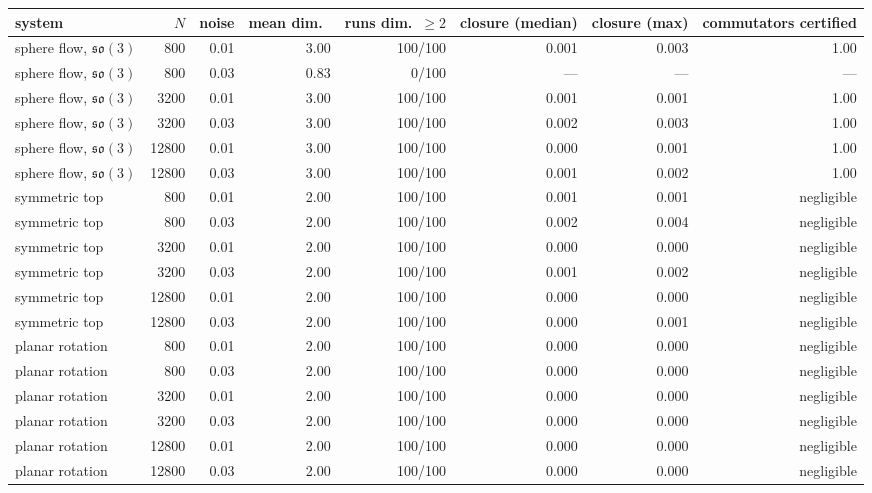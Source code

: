 \begin{table}[!htbp]
\centering\small
\begin{adjustbox}{max width=\textwidth, max totalheight=0.9\textheight}
\begin{tabular}{lrrrrrrr}
\toprule
system & $N$ & noise & mean dim.\ & runs dim.\ $\ge 2$ & closure (median) & closure (max) & commutators certified \\
\midrule
sphere flow, $\mathfrak{so}(3)$ & 800 & 0.01 & 3.00 & 100/100 & 0.001 & 0.003 & 1.00 \\
sphere flow, $\mathfrak{so}(3)$ & 800 & 0.03 & 0.83 & 0/100 & --- & --- & --- \\
sphere flow, $\mathfrak{so}(3)$ & 3200 & 0.01 & 3.00 & 100/100 & 0.001 & 0.001 & 1.00 \\
sphere flow, $\mathfrak{so}(3)$ & 3200 & 0.03 & 3.00 & 100/100 & 0.002 & 0.003 & 1.00 \\
sphere flow, $\mathfrak{so}(3)$ & 12800 & 0.01 & 3.00 & 100/100 & 0.000 & 0.001 & 1.00 \\
sphere flow, $\mathfrak{so}(3)$ & 12800 & 0.03 & 3.00 & 100/100 & 0.001 & 0.002 & 1.00 \\
symmetric top & 800 & 0.01 & 2.00 & 100/100 & 0.001 & 0.001 & negligible \\
symmetric top & 800 & 0.03 & 2.00 & 100/100 & 0.002 & 0.004 & negligible \\
symmetric top & 3200 & 0.01 & 2.00 & 100/100 & 0.000 & 0.000 & negligible \\
symmetric top & 3200 & 0.03 & 2.00 & 100/100 & 0.001 & 0.002 & negligible \\
symmetric top & 12800 & 0.01 & 2.00 & 100/100 & 0.000 & 0.000 & negligible \\
symmetric top & 12800 & 0.03 & 2.00 & 100/100 & 0.000 & 0.001 & negligible \\
planar rotation & 800 & 0.01 & 2.00 & 100/100 & 0.000 & 0.000 & negligible \\
planar rotation & 800 & 0.03 & 2.00 & 100/100 & 0.000 & 0.000 & negligible \\
planar rotation & 3200 & 0.01 & 2.00 & 100/100 & 0.000 & 0.000 & negligible \\
planar rotation & 3200 & 0.03 & 2.00 & 100/100 & 0.000 & 0.000 & negligible \\
planar rotation & 12800 & 0.01 & 2.00 & 100/100 & 0.000 & 0.000 & negligible \\
planar rotation & 12800 & 0.03 & 2.00 & 100/100 & 0.000 & 0.000 & negligible \\

\end{tabular}
\end{adjustbox}
\end{table}
